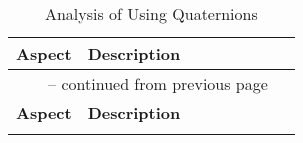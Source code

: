 \renewcommand{\arraystretch}{1.2} %
\begin{longtable}{p{0.25\linewidth} p{0.75\linewidth}}
    \caption{Analysis of Using Quaternions}\label{tab:quaternion_analysis}\\
    \toprule %
    \textbf{Aspect} & \textbf{Description} \\
    \toprule %
    \endfirsthead

    \multicolumn{2}{c}{\tablename~\thetable{} -- continued from previous page} \\
    \toprule %
    \textbf{Aspect} & \textbf{Description} \\
    \toprule %
    \endhead

    \bottomrule %
    \endfoot

    \bottomrule %
    \endlastfoot


\end{longtable}
